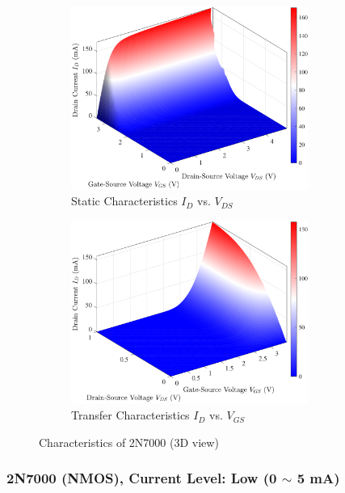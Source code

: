 \documentclass[UTF8]{article}
\begin{document}
\begin{figure}[H]\centering
\begin{subfigure}[b]{0.5\columnwidth}\centering
    \includegraphics[height=170pt]{LCE-04-场效应管/assets/2N7000/2N7000 (NMOS) [onsemi, KH32] 3D current high/2025-04-24_21-05-11.pdf}
    \caption{Static Characteristics $I_D$ vs. $V_{DS}$}
\end{subfigure}\hfill
\begin{subfigure}[b]{0.5\columnwidth}\centering
    \includegraphics[height=170pt]{LCE-04-场效应管/assets/2N7000/2N7000 (NMOS) [onsemi, KH32] 3D current high/2025-04-24_21-05-16.pdf}
    \caption{Transfer Characteristics $I_D$ vs. $V_{GS}$}
\end{subfigure}
\caption{Characteristics of 2N7000 (3D view)}
\end{figure}


\subsubsection{2N7000 (NMOS), Current Level: Low (0 $\sim$ 5 mA)}
\end{document}
